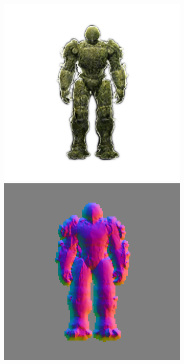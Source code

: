 \begin{figure}[H]
\begin{subfigure}[b]{0.18\textwidth}
        \caption{}
    \end{subfigure}
    \begin{subfigure}[b]{0.18\textwidth}
        \centering
        \fontsize{9pt}{7pt}\selectfont{}
        \includegraphics[width=\textwidth]{figures/generationProcess/wonder3D_9000_front_part2}
        \includegraphics[width=\textwidth]{figures/generationProcess/wonder3D_9000_front_part4}

\end{subfigure}
\end{figure}
